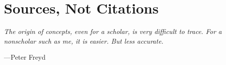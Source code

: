 



\newpage


\toclineskip
\section{Sources, Not Citations}

\begin{displayquote}
	\textit{The origin of concepts, even for a scholar, is very difficult to trace. For a nonscholar such as me, it is easier. But less accurate.}
	\begin{flushright}
		---Peter Freyd
	\end{flushright}
	\vspace{4mm}
\end{displayquote}


